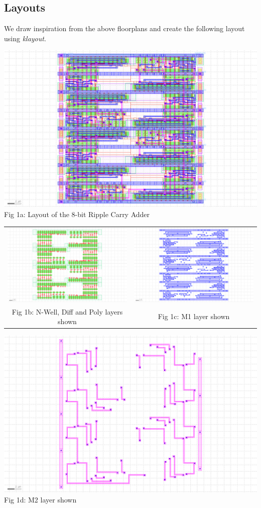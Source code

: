 \documentclass[12pt,a4paper]{article}
\begin{document}
\subsection{Layouts}
\noindent We draw inspiration from the above floorplans and create the following layout using \emph{klayout}.
\begin{center}
     \includegraphics[width=0.99\linewidth]{tut6/rca/rca8b.gds.png} \\
     Fig 1a: Layout of the 8-bit Ripple Carry Adder
\begin{tabular}{cc}
     \includegraphics[width=0.48\linewidth]{tut6/rca/rca8b.mos.gds.png} &
     \includegraphics[width=0.48\linewidth]{tut6/rca/rca8b.m1.gds.png} \\
     Fig 1b: N-Well, Diff and Poly layers shown & Fig 1c: M1 layer shown
\end{tabular}
    \includegraphics[width=0.48\linewidth]{tut6/rca/rca8b.m2.gds.png} \\ Fig 1d: M2 layer shown
\end{center}
\end{document}

